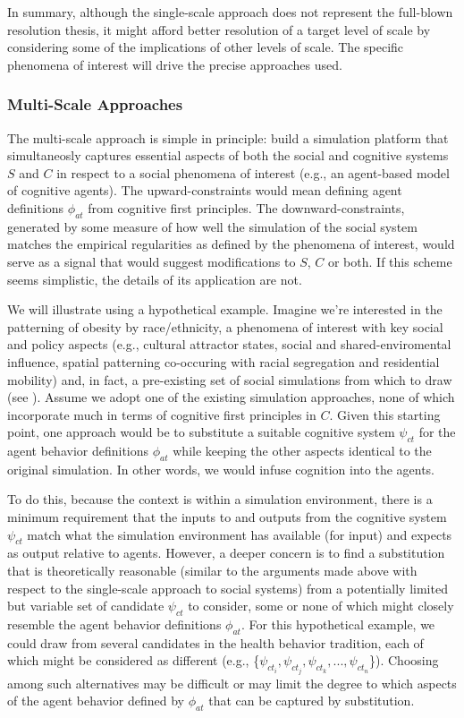 \documentclass{article}
\begin{document}
In summary, although the single-scale approach does not represent the full-blown resolution thesis, it might afford better resolution of a target level of scale by considering some of the implications of other levels of scale. The specific phenomena of interest will drive the precise approaches used.

\subsubsection{Multi-Scale Approaches}
The multi-scale approach is simple in principle: build a simulation platform that simultaneosly captures essential aspects of both the social and cognitive systems $S$ and $C$ in respect to a social phenomena of interest (e.g., an agent-based model of cognitive agents).  The upward-constraints would mean defining agent definitions $\phi_{at}$ from cognitive first principles. The downward-constraints, generated by some measure of how well the simulation of the social system matches the empirical regularities as defined by the phenomena of interest, would serve as a signal that would suggest modifications to $S$, $C$ or both.  If this scheme seems simplistic, the details of its application are not. 
 
We will illustrate using a hypothetical example. Imagine we're interested in the patterning of obesity by race/ethnicity, a phenomena of interest with key social and policy aspects (e.g., cultural attractor states, social and shared-enviromental influence, spatial patterning co-occuring with racial segregation and residential mobility) and, in fact, a pre-existing set of social simulations from which to draw (see \cite{nianogo2015agent}).  Assume we adopt one of the existing simulation approaches, none of which incorporate much in terms of cognitive first principles in $C$.  Given this starting point, one approach would be to substitute a suitable cognitive system $\psi_{ct}$ for the agent behavior definitions $\phi_{at}$  while keeping the other aspects identical to the original simulation. In other words, we would infuse cognition into the agents.  

To do this, because the context is within a simulation environment, there is a minimum requirement that the inputs to and outputs from the cognitive system $\psi_{ct}$ match what the simulation environment has available (for input) and expects as output relative to agents.  However, a deeper concern is to find a substitution that is theoretically reasonable (similar to the arguments made above with respect to the single-scale approach to social systems) from a potentially limited but variable set of candidate $\psi_{ct}$ to consider, some or none of which might closely resemble the agent behavior definitions $\phi_{at}$. For this hypothetical example, we could draw from several candidates in the health behavior tradition, each of which might be considered as different (e.g., \{$\psi_{ct_i}, \psi_{ct_j}, \psi_{ct_k},...,\psi_{ct_n}$\}).  Choosing among such alternatives may be difficult or may limit the degree to which aspects of the agent behavior defined by $\phi_{at}$ that can be captured by substitution.
\end{document}
